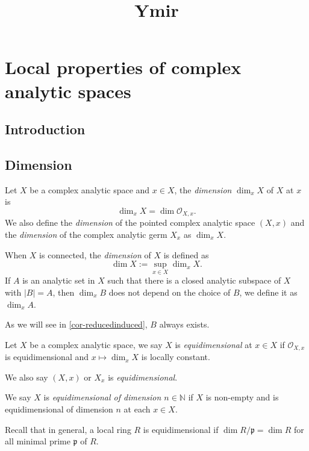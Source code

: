 
\title{Ymir}

\maketitle
\tableofcontents

\chapter*{Local properties of complex analytic spaces}\label{chap-propcomplex}

\section{Introduction}\label{sec-introduction-propertycomplex}


\section{Dimension}

\begin{definition}
    Let $X$ be a complex analytic space and $x\in X$, the \emph{dimension} $\dim_x X$ of $X$ at $x$ is 
    \[
        \dim_x X=\dim \mathcal{O}_{X,x}.
    \]
    We also define the \emph{dimension} of the pointed complex analytic space $(X,x)$ and the \emph{dimension} of the complex analytic germ $X_x$ as $\dim_x X$.

    When $X$ is connected, the \emph{dimension} of $X$ is defined as
    \[
        \dim X:=\sup_{x\in X}\dim_x X.  
    \]
    If $A$ is an analytic set in $X$ such that there is a closed analytic subspace of $X$ with $|B|=A$, then $\dim_x B$ does not depend on the choice of $B$, we define it as $\dim_x A$. 
\end{definition}
As we will see in \cref{cor-reducedinduced}, $B$ always exists.


\begin{definition}
    Let $X$ be a complex analytic space, we say $X$ is \emph{equidimensional} at $x\in X$ if $\mathcal{O}_{X,x}$ is equidimensional and $x\mapsto \dim_x X$ is locally constant.

    We also say $(X,x)$ or $X_x$ is \emph{equidimensional}.

    We say $X$ is \emph{equidimensional of dimension $n\in \mathbb{N}$} if $X$ is non-empty and is equidimensional of dimension $n$ at each $x\in X$.
\end{definition}
Recall that in general, a local ring $R$ is equidimensional if $\dim R/\mathfrak{p}=\dim R$ for all minimal prime $\mathfrak{p}$ of $R$.

